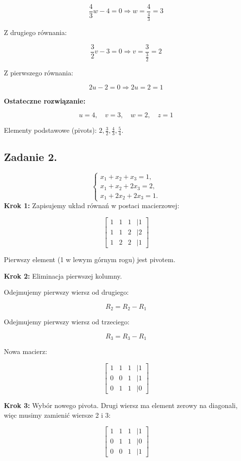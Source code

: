 \documentclass{article}
\begin{document}
\[
\frac{4}{3}w - 4 = 0 \Rightarrow w = \frac{4}{\frac{4}{3}} = 3
\]

Z drugiego równania:

\[
\frac{3}{2}v - 3 = 0 \Rightarrow v = \frac{3}{\frac{3}{2}} = 2
\]

Z pierwszego równania:

\[
2u - 2 = 0 \Rightarrow 2u = 2 = 1
\]

\textbf{Ostateczne rozwiązanie:}

\[
u = 4, \quad v = 3, \quad w = 2, \quad z = 1
\]

Elementy podstawowe (pivots): \( 2, \frac{3}{2}, \frac{4}{3}, \frac{5}{4} \).
\subsection{Zadanie 2.}
\[
\begin{cases}
x_1 + x_2 + x_3 = 1, \\
x_1 + x_2 + 2x_3 = 2, \\
x_1 + 2x_2 + 2x_3 = 1.
\end{cases}
\]
\textbf{Krok 1:} Zapisujemy układ równań w postaci macierzowej:

\[
\begin{bmatrix}
1 & 1 & 1 & | 1 \\
1 & 1 & 2 & | 2 \\
1 & 2 & 2 & | 1
\end{bmatrix}
\]

Pierwszy element (1 w lewym górnym rogu) jest pivotem.

\textbf{Krok 2:} Eliminacja pierwszej kolumny.

Odejmujemy pierwszy wiersz od drugiego:

\[
R_2 = R_2 - R_1
\]

Odejmujemy pierwszy wiersz od trzeciego:

\[
R_3 = R_3 - R_1
\]

Nowa macierz:

\[
\begin{bmatrix}
1 & 1 & 1 & | 1 \\
0 & 0 & 1 & | 1 \\
0 & 1 & 1 & | 0
\end{bmatrix}
\]

\textbf{Krok 3:} Wybór nowego pivota. Drugi wiersz ma element zerowy na diagonali, więc musimy zamienić wiersze 2 i 3:

\[
\begin{bmatrix}
1 & 1 & 1 & | 1 \\
0 & 1 & 1 & | 0 \\
0 & 0 & 1 & | 1
\end{bmatrix}
\]
\end{document}
